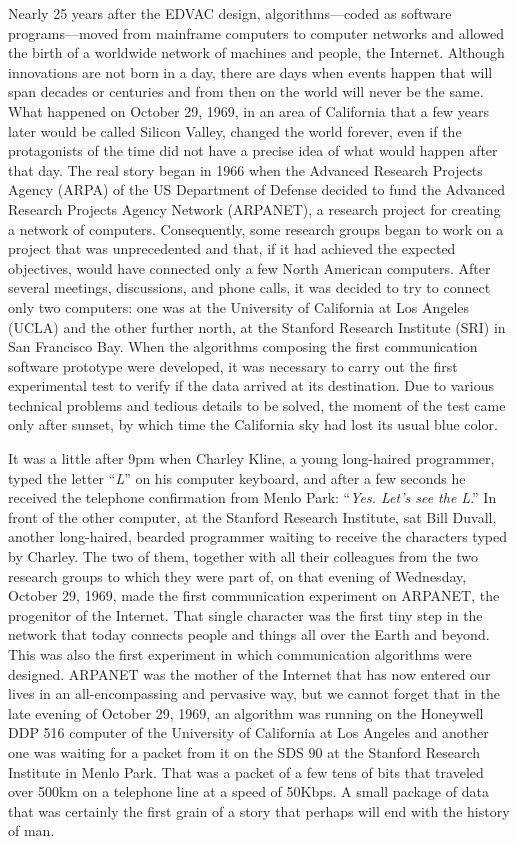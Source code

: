 {{{Nearly 25 years after the EDVAC design, algorithms---coded as software programs---moved from mainframe computers to computer networks and allowed the birth of a worldwide network of machines and people, the Internet. Although innovations are not born in a day, there are days when events happen that will span decades or centuries and from then on the world will never be the same. What happened on October 29, 1969, in an area of California that a few years later would be called Silicon Valley, changed the world forever, even if the protagonists of the time did not have a precise idea of what would happen after that day. The real story began in 1966 when the Advanced Research Projects Agency (ARPA) of the US Department of Defense decided to fund the Advanced Research Projects Agency Network (ARPANET), a research project for creating a network of computers. Consequently, some research groups began to work on a project that was unprecedented and that, if it had achieved the expected objectives, would have connected only a few North American computers. After several meetings, discussions, and phone calls, it was decided to try to connect only two computers: one was at the University of California at Los Angeles (UCLA) and the other further north, at the Stanford Research Institute (SRI) in San Francisco Bay. When the algorithms composing the first communication software prototype were developed, it was necessary to carry out the first experimental test to verify if the data arrived at its destination. Due to various technical problems and tedious details to be solved, the moment of the test came only after sunset, by which time the California sky had lost its usual blue color.

It was a little after 9pm when Charley Kline, a young long-haired programmer, typed the letter ``\textit{L}'' on his computer keyboard, and after a few seconds he received the telephone confirmation from Menlo Park: ``\textit{Yes. Let's see the L}.'' In front of the other computer, at the Stanford Research Institute, sat Bill Duvall, another long-haired, bearded programmer waiting to receive the characters typed by Charley. The two of them, together with all their colleagues from the two research groups to which they were part of, on that evening of Wednesday, October 29, 1969, made the first communication experiment on ARPANET, the progenitor of the Internet. That single character was the first tiny step in the network that today connects people and things all over the Earth and beyond. This was also the first experiment in which communication algorithms were designed. ARPANET was the mother of the Internet that has now entered our lives in an all-encompassing and pervasive way, but we cannot forget that in the late evening of October 29, 1969, an algorithm was running on the Honeywell DDP 516 computer of the University of California at Los Angeles and another one was waiting for a packet from it on the SDS 90 at the Stanford Research Institute in Menlo Park. That was a packet of a few tens of bits that traveled over 500km on a telephone line at a speed of 50Kbps. A small package of data that was certainly the first grain of a story that perhaps will end with the history of man.

}}}
